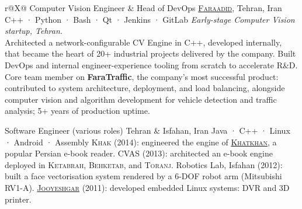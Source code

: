 \begin{xltabular}{\textwidth}{r@{}X@{}}
  {Computer Vision Engineer \& Head of DevOps}
  {\href{https://faraadid.com/}{\textsc{Faraadid}}, Tehran, Iran\quad\href{https://github.com/Faraadid/}{}}
  {C++ · Python · Bash · Qt · Jenkins · GitLab}
  {\small\textit{Early-stage Computer Vision startup, Tehran.}\\[1mm]
    \tabitem Architected a network-configurable CV Engine in C++, developed internally, that became the heart of 20+ industrial projects delivered by the company.
    \tabitem Built DevOps and internal engineer-experience tooling from scratch to accelerate R\&D.
    \tabitem Core team member on \textbf{FaraTraffic}, the company's most successful product: contributed to system architecture, deployment, and load balancing, alongside computer vision and algorithm development for vehicle detection and traffic analysis; 5+ years of production uptime.%
  }

  {Software Engineer (various roles)}
  {Tehran \& Isfahan, Iran}
  {Java · C++ · Linux · Android · Assembly}
  {%
    \tabitem \textsc{Khak} (2014): engineered the engine of \href{http://khatkhan.com/}{\textsc{Khatkhan}}, a popular Persian e-book reader.
    \tabitem \textsc{CVAS} (2013): architected an e-book engine deployed in \textsc{Ketabrah}, \textsc{Behketab}, and \textsc{Toranj}.
    \tabitem Robotics Lab, Isfahan (2012): built a face vectorisation system rendered by a 6-DOF robot arm (Mitsubishi RV1-A).
    \tabitem \href{https://www.jooyeshgar.net/}{\textsc{Jooyeshgar}} (2011): developed embedded Linux systems: DVR and 3D printer.%
  }

\end{xltabular}
